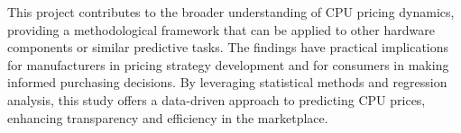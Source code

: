 This project contributes to the broader understanding of CPU pricing dynamics, providing a methodological framework that can be applied to other hardware components or similar predictive tasks. The findings have practical implications for manufacturers in pricing strategy development and for consumers in making informed purchasing decisions. By leveraging statistical methods and regression analysis, this study offers a data-driven approach to predicting CPU prices, enhancing transparency and efficiency in the marketplace.\\


\newpage